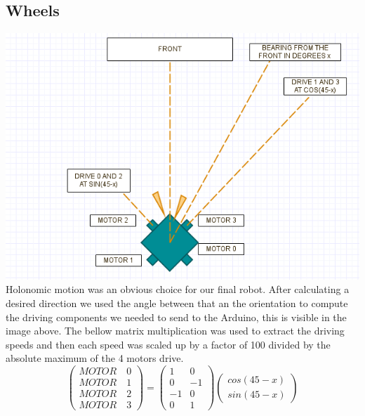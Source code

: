 \documentclass[a4paper,12pt]{article}
\begin{document}
\subsection{Wheels}
\includegraphics[scale=.5]{holonomics.png}\newline
Holonomic motion was an obvious choice for our final robot. After calculating a desired direction we used the angle between that an the orientation to compute the driving components we needed to send to the Arduino, this is visible in the image above. The bellow matrix multiplication was used to extract the driving speeds and then each speed was scaled up by a factor of 100 divided by the absolute maximum of the 4 motors drive.
$$\begin{pmatrix}
MOTOR\quad0\\ 
MOTOR\quad1\\ 
MOTOR\quad2\\ 
MOTOR\quad3
\end{pmatrix}=
\begin{pmatrix}
1 & 0\\ 
0 & -1\\ 
-1 & 0\\ 
0 & 1 
\end{pmatrix}
\begin{pmatrix}
cos(45-x)\\ 
sin(45-x)
\end{pmatrix}$$
\end{document}
